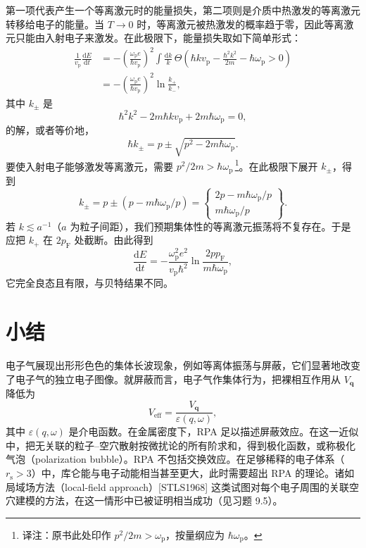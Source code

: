 第一项代表产生一个等离激元时的能量损失，第二项则是介质中热激发的等离激元转移给电子的能量。当 $T\to0$ 时，等离激元被热激发的概率趋于零，因此等离激元只能由入射电子来激发。在此极限下，能量损失取如下简单形式：
\begin{align*}
\frac{1}{v_{\mathrm{p}}}\frac{\mathrm{d}E}{\mathrm{d}t}&=-\left(\frac{\omega_{\mathrm{p}}e}{\hbar v_{\mathrm{p}}}\right)^{2}\int\frac{\mathrm{d}k}{k}\,\Theta\left(\hbar kv_{\mathrm{p}}-\frac{\hbar^{2}k^{2}}{2m}-\hbar\omega_{\mathrm{p}}>0\right)\\
&=-\left(\frac{\omega_{\mathrm{p}}e}{\hbar v_{\mathrm{p}}}\right)^{2}\ln\frac{k_{+}}{k_{-}},
\tag{9.160}
\end{align*}
其中 $k_{\pm}$ 是
\begin{equation*}
\hbar^{2}k^{2}-2m\hbar kv_{\mathrm{p}}+2m\hbar\omega_{\mathrm{p}}=0,
\tag{9.161}
\end{equation*}
的解，或者等价地，
\begin{equation*}
\hbar k_{\pm}=p\pm\sqrt{p^{2}-2m\hbar\omega_{\mathrm{p}}}.
\tag{9.162}
\end{equation*}
要使入射电子能够激发等离激元，需要 $p^{2}/2m>\hbar\omega_{\mathrm{p}}$\,\footnote{译注：原书此处印作 $p^{2}/2m>\omega_{\mathrm{p}}$，按量纲应为 $\hbar\omega_{\mathrm{p}}$。}。在此极限下展开 $k_{\pm}$，得到
\begin{equation*}
k_{\pm}=p\pm(p-m\hbar\omega_{\mathrm{p}}/p)=\left\{\begin{array}{c}2p-m\hbar\omega_{\mathrm{p}}/p\\ m\hbar\omega_{\mathrm{p}}/p\end{array}\right\}.
\tag{9.163}
\end{equation*}
若 $k\lesssim a^{-1}$（$a$ 为粒子间距），我们预期集体性的等离激元振荡将不复存在。于是应把 $k_{+}$ 在 $2p_{\mathrm{F}}$ 处截断。由此得到
\begin{equation*}
\frac{\mathrm{d}E}{\mathrm{d}t}=-\frac{\omega_{\mathrm{p}}^{2}e^{2}}{v_{\mathrm{p}}\hbar^{2}}\ln\frac{2pp_{\mathrm{F}}}{m\hbar\omega_{\mathrm{p}}},
\tag{9.164}
\end{equation*}
它完全良态且有限，与贝特结果不同。

\section*{小结}

电子气展现出形形色色的集体长波现象，例如等离体振荡与屏蔽，它们显著地改变了电子气的独立电子图像。就屏蔽而言，电子气作集体行为，把裸相互作用从 $V_{\mathbf{q}}$ 降低为
\begin{equation*}
V_{\mathrm{eff}}=\frac{V_{\mathbf{q}}}{\varepsilon(q,\omega)},
\tag{9.165}
\end{equation*}
其中 $\varepsilon(q,\omega)$ 是介电函数。在金属密度下，RPA 足以描述屏蔽效应。在这一近似中，把无关联的粒子–空穴散射按微扰论的所有阶求和，得到极化函数，或称极化气泡（polarization bubble）。RPA 不包括交换效应。在足够稀释的电子体系（$r_{\mathrm{s}}>3$）中，库仑能与电子动能相当甚至更大，此时需要超出 RPA 的理论。诸如局域场方法（local-field approach）[STLS1968] 这类试图对每个电子周围的关联空穴建模的方法，在这一情形中已被证明相当成功（见习题 9.5）。

